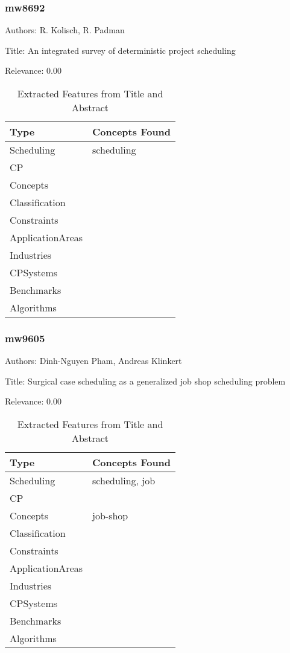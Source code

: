 \subsubsection{mw8692}
\label{mw:mw8692}

Authors: R. Kolisch, R. Padman

Title: An integrated survey of deterministic project scheduling

Relevance:  0.00

{\scriptsize
\begin{longtable}{p{2cm}p{20cm}}
\caption{Extracted Features from Title and Abstract}\\ \toprule
Type & Concepts Found\\ \midrule
\endhead
\bottomrule
\endfoot
Scheduling & scheduling\\ 
CP & \\ 
Concepts & \\ 
Classification & \\ 
Constraints & \\ 
ApplicationAreas & \\ 
Industries & \\ 
CPSystems & \\ 
Benchmarks & \\ 
Algorithms & \\ 
\end{longtable}
}



\subsubsection{mw9605}
\label{mw:mw9605}

Authors: Dinh-Nguyen Pham, Andreas Klinkert

Title: Surgical case scheduling as a generalized job shop scheduling problem

Relevance:  0.00

{\scriptsize
\begin{longtable}{p{2cm}p{20cm}}
\caption{Extracted Features from Title and Abstract}\\ \toprule
Type & Concepts Found\\ \midrule
\endhead
\bottomrule
\endfoot
Scheduling & scheduling, job\\ 
CP & \\ 
Concepts & job-shop\\ 
Classification & \\ 
Constraints & \\ 
ApplicationAreas & \\ 
Industries & \\ 
CPSystems & \\ 
Benchmarks & \\ 
Algorithms & \\ 
\end{longtable}
}



